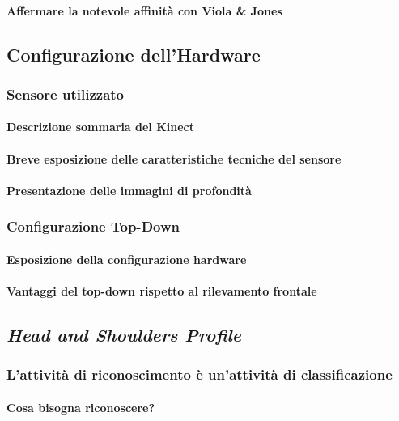                 \paragraph{Affermare la notevole affinità con Viola & Jones}
        \subsection{Configurazione dell'Hardware}
        \label{sub:hardware_configuration}
            \subsubsection{Sensore utilizzato}
                \paragraph{Descrizione sommaria del Kinect}
                \paragraph{Breve esposizione delle caratteristiche tecniche del sensore}
                \paragraph{Presentazione delle immagini di profondità}
            \subsubsection{Configurazione Top-Down}
                \paragraph{Esposizione della configurazione hardware}
                \paragraph{Vantaggi del top-down rispetto al rilevamento frontale}
        \subsection{\emph{Head and Shoulders Profile}}
        \label{sub:hasp}
            \subsubsection{L'attività di riconoscimento è un'attività di classificazione}
                \paragraph{Cosa bisogna riconoscere?}
